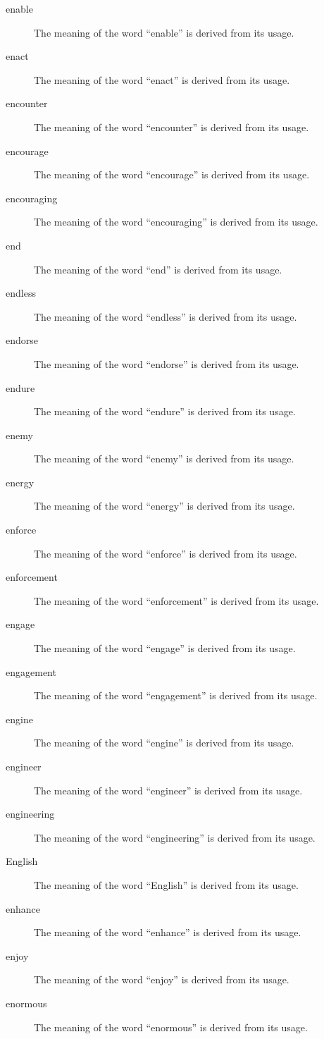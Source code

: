 \documentclass[12pt, letterpaper]{memoir}
\begin{document}
\begin{description}
\item[enable] The meaning of the word ``enable'' is derived from its usage.
\item[enact] The meaning of the word ``enact'' is derived from its usage.
\item[encounter] The meaning of the word ``encounter'' is derived from its usage.
\item[encourage] The meaning of the word ``encourage'' is derived from its usage.
\item[encouraging] The meaning of the word ``encouraging'' is derived from its usage.
\item[end] The meaning of the word ``end'' is derived from its usage.
\item[endless] The meaning of the word ``endless'' is derived from its usage.
\item[endorse] The meaning of the word ``endorse'' is derived from its usage.
\item[endure] The meaning of the word ``endure'' is derived from its usage.
\item[enemy] The meaning of the word ``enemy'' is derived from its usage.
\item[energy] The meaning of the word ``energy'' is derived from its usage.
\item[enforce] The meaning of the word ``enforce'' is derived from its usage.
\item[enforcement] The meaning of the word ``enforcement'' is derived from its usage.
\item[engage] The meaning of the word ``engage'' is derived from its usage.
\item[engagement] The meaning of the word ``engagement'' is derived from its usage.
\item[engine] The meaning of the word ``engine'' is derived from its usage.
\item[engineer] The meaning of the word ``engineer'' is derived from its usage.
\item[engineering] The meaning of the word ``engineering'' is derived from its usage.
\item[English] The meaning of the word ``English'' is derived from its usage.
\item[enhance] The meaning of the word ``enhance'' is derived from its usage.
\item[enjoy] The meaning of the word ``enjoy'' is derived from its usage.
\item[enormous] The meaning of the word ``enormous'' is derived from its usage.

\end{description}
\end{document}
